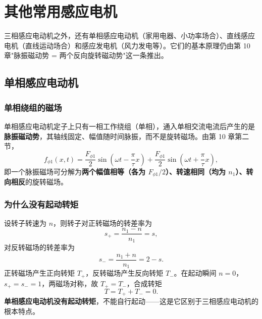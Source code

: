 \chapter{其他常用感应电机}

三相感应电动机之外，还有单相感应电动机（家用电器、小功率场合）、直线感应电机（直线运动场合）和感应发电机（风力发电等）。它们的基本原理仍由第 10 章"脉振磁动势 = 两个反向旋转磁动势"这一条推出。

\section{单相感应电动机}

\subsection{单相绕组的磁场}
单相感应电动机定子上只有一相工作绕组（单相），通入单相交流电流后产生的是\textbf{脉振磁动势}，其轴线固定、幅值随时间脉振，而不是旋转磁场。由第 10 章第二节，
\begin{equation}
f_{\phi1}(x,t)=\frac{F_{\phi1}}{2}\sin\left(\omega t-\frac{\pi}{\tau}x\right)
+\frac{F_{\phi1}}{2}\sin\left(\omega t+\frac{\pi}{\tau}x\right),
\end{equation}
即一个脉振磁场可分解为\textbf{两个幅值相等（各为 $F_{\phi1}/2$）、转速相同（均为 $n_1$）、转向相反}的旋转磁场。

\subsection{为什么没有起动转矩}
设转子转速为 $n$，则转子对正转磁场的转差率为
\begin{equation}
s_+=\frac{n_1-n}{n_1}=s,
\end{equation}
对反转磁场的转差率为
\begin{equation}
s_-=\frac{n_1+n}{n_1}=2-s .
\end{equation}
正转磁场产生正向转矩 $T_+$，反转磁场产生反向转矩 $T_-$。在起动瞬间 $n=0$，$s_+=s_-=1$，两磁场对称，故 $T_+=T_-$，合成转矩
\begin{equation}
T=T_++T_-=0 .
\end{equation}
\textbf{单相感应电动机没有起动转矩}，不能自行起动——这是它区别于三相感应电动机的根本特点。


